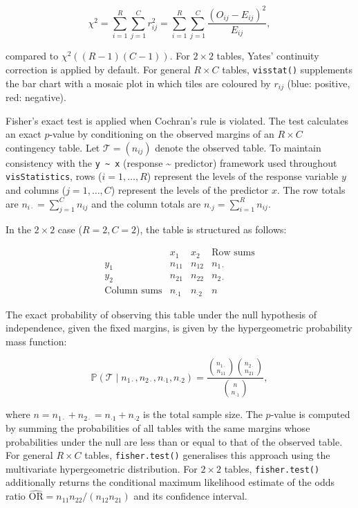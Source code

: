 \[\chi^2 = \sum_{i=1}^{R}\sum_{j=1}^{C} r_{ij}^2
         = \sum_{i=1}^{R}\sum_{j=1}^{C} \frac{(O_{ij}-E_{ij})^2}{E_{ij}},\]

compared to \(\chi^2\!\left((R-1)(C-1)\right)\). For \(2\times 2\) tables,
Yates' continuity correction \citep{Yates:1934} is applied by default. For
general \(R \times C\) tables, \texttt{visstat()} supplements the bar chart with
a mosaic plot in which tiles are coloured by \(r_{ij}\) (blue: positive,
red: negative).

Fisher's exact test \citep{Fisher:1970} is applied when Cochran's rule
\citep{Cochran:1954} is violated. The test calculates an exact \(p\)-value by
conditioning on the observed margins of an \(R \times C\) contingency
table. Let \(\mathcal{T} = (n_{ij})\) denote the observed table. To
maintain consistency with the \texttt{y\ \textasciitilde{}\ x} (response \textasciitilde{} predictor) framework
used throughout \texttt{visStatistics}, rows (\(i=1,\ldots,R\)) represent the
levels of the response variable \(y\) and columns (\(j=1,\ldots,C\))
represent the levels of the predictor \(x\). The row totals are
\(n_{i\cdot} = \sum_{j=1}^C n_{ij}\) and the column totals are
\(n_{\cdot j} = \sum_{i=1}^R n_{ij}\).

In the \(2 \times 2\) case (\(R=2, C=2\)), the table is structured as
follows:

\[\begin{array}{c|cc|c}
& x_1 & x_2 & \text{Row sums} \\
\hline
y_1 & n_{11} & n_{12} & n_{1\cdot} \\
y_2 & n_{21} & n_{22} & n_{2\cdot} \\
\hline
\text{Column sums} & n_{\cdot 1} & n_{\cdot 2} & n
\end{array}\]

The exact probability of observing this table under the null hypothesis
of independence, given the fixed margins, is given by the hypergeometric
probability mass function:

\[\mathbb{P}(\mathcal{T} \mid n_{1\cdot}, n_{2\cdot}, n_{\cdot 1}, n_{\cdot 2})
= \frac{\binom{n_{1\cdot}}{n_{11}} \binom{n_{2\cdot}}{n_{21}}}{\binom{n}{n_{\cdot 1}}},\]

where \(n = n_{1\cdot} + n_{2\cdot} = n_{\cdot 1} + n_{\cdot 2}\) is the
total sample size. The \(p\)-value is computed by summing the probabilities
of all tables with the same margins whose probabilities under the null
are less than or equal to that of the observed table. For general
\(R \times C\) tables, \texttt{fisher.test()} generalises this approach using the
multivariate hypergeometric distribution. For \(2 \times 2\) tables,
\texttt{fisher.test()} additionally returns the conditional maximum likelihood
estimate of the odds ratio
\(\widehat{\text{OR}} = n_{11}n_{22}/(n_{12}n_{21})\) and its confidence
interval.

